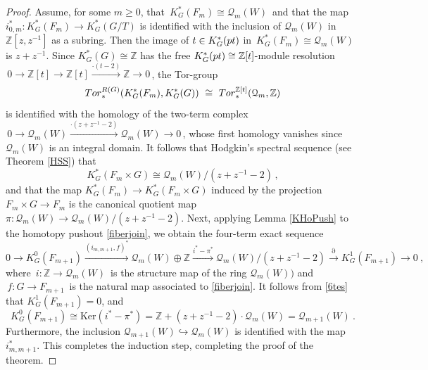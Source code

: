 \documentclass[11pt]{amsart}
\theoremstyle{definition}
\theoremstyle{remark}
\numberwithin{equation}{section}
\newcommand{\la}{\label}
\newcommand{\Ker}{\mathrm{Ker}}
\newcommand{\into}{\hookrightarrow}
\def\cQ{\mathcal{Q}}
\def\Z{\mathbb{Z}}
\begin{document}
\begin{proof}
Assume, for some $m \ge 0$, that  $\,K^{\ast}_G(F_m) \cong \cQ_m(W)\,$ and that the map $ i^*_{0,m}: K^{\ast}_G(F_m) \to K^{\ast}_G(G/T)$ is identified with the inclusion of $\cQ_m(W)$ in $\Z[z,z^{-1}]$ as a subring. Then the image of $t \in K^{\ast}_G({\rm pt})$ in $\,K^{\ast}_G(F_m) \cong \cQ_m(W)\,$ is $z+z^{-1}$.
 Since $K^{\ast}_G(G) \cong \Z$ has the free $K^{\ast}_G({\rm pt}) \cong \Z[t]$-module resolution 
$\, 0 \to \Z[t] \to  \Z[t]  \stackrel{\cdot (t-2)}{\longrightarrow} \Z \to 0\,$, the Tor-group
$$
{\rm Tor}_{*}^{R(G)}(K^{\ast}_G(F_m), K^{\ast}_G(G))\ \cong\  {\rm Tor}_*^{\Z[t]}(\cQ_m, \Z)
$$ 
is identified with the homology of the two-term complex 
$\, 0 \to  \cQ_m(W) \stackrel{\cdot (z+z^{-1}-2)}{\longrightarrow}  \cQ_m(W) \to 0 \,$, whose first homology vanishes since $ \cQ_m(W)$ is an integral domain. It follows that Hodgkin's spectral sequence (see Theorem \ref{HSS}) that
%
$$ 
K^{\ast}_G(F_m \times G) \cong \cQ_m(W)/(z+z^{-1}-2)\, ,
$$
%
and that the map $K^{\ast}_G(F_m) \to K^{\ast}_G(F_m \times G)$ induced by the projection $F_m \times G \to F_m$ is the canonical quotient map $\pi: \cQ_m(W) \to \cQ_m(W)/(z+z^{-1}-2)$. Next, applying Lemma \ref{KHoPush} to the homotopy pushout \eqref{fiberjoin}, we obtain the 
four-term exact sequence 
%
\begin{equation} \la{6tes}
0 \to K^0_G(F_{m+1}) \xrightarrow{(i_{m, m+1}, f)^{\ast}} \cQ_m(W) \oplus \Z 
\xrightarrow{ i^*-\pi^*}  
\cQ_m(W)/(z+z^{-1}-2) \xrightarrow{\partial}
 K^1_G(F_{m+1}) \to 0\ ,
\end{equation}
%
where $\,i:\Z \to \cQ_m(W)\,$ is the structure map of the ring $ \cQ_m(W)) $ and $\,f: G \to F_{m+1}\,$ is the natural map associated to  \eqref{fiberjoin}. It follows from \eqref{6tes} that $K^1_G(F_{m+1})=0$, and 
$$ K^0_G(F_{m+1}) \cong \Ker(i^*-\pi^*) = \Z + (z+z^{-1}-2) \cdot \cQ_m(W) = \cQ_{m+1}(W) \ .
$$
Furthermore, the inclusion $ \cQ_{m+1}(W) \into \cQ_{m}(W)$ is identified with the map $i_{m,m+1}^{\ast}$. This completes the induction step, completing the proof of the theorem.  
\end{proof}
\end{document}
